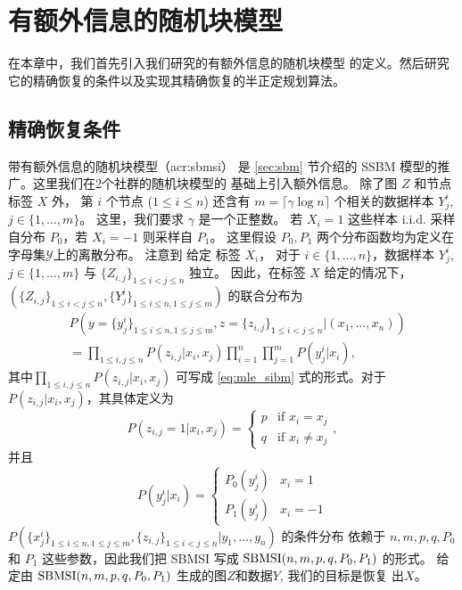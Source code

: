 \chapter{有额外信息的随机块模型}
\label{chap:sbmsi}
在本章中，我们首先引入我们研究的有额外信息的随机块模型
的定义。然后研究它的精确恢复的条件以及实现其精确恢复的半正定规划算法。

\section{精确恢复条件}
\label{sec:sbmsi_exact_recovery_condtion}
带有额外信息的随机块模型（\gls{acr:sbmsi}）
是 \ref{sec:sbm} 节介绍的
SSBM 模型的推广。这里我们在2个社群的随机块模型的
基础上引入额外信息。
除了图 $Z$ 和节点标签 $X$ 外，
第 $i$  个节点 ($1\leq i \leq n$) 
还含有 $m=\lceil \gamma \log n \rceil $ 个相关的数据样本 
$Y^{i}_{j}$, $j\in \{1,\ldots,m\}$。
这里，我们要求 $\gamma$ 是一个正整数。
若 $X_i=1$
这些样本 i.i.d. 采样自分布 $P_0$，若  $X_i=-1$ 则采样自 $P_1$。
这里假设 $P_0, P_1$ 两个分布函数均为定义在字母集$\mathcal{Y}$上的离散分布。
注意到 给定 标签 $X_i$，
对于 $i\in\{1,\ldots,n\}$，数据样本 $Y^{i}_{j}$, $j\in \{1,\ldots,m\}$ 与 $\{Z_{i,j}\}_{1\le i<j\le n}$ 独立。
 因此，在标签 $X$ 给定的情况下，
  $(\{Z_{i,j}\}_{1\le i<j\le n},\{Y^i_{j}\}_{1\le i\le n,1\le j\le m})$ 的联合分布为  
\begin{align}\label{eq:lh}
    &P(y=\{y^i_{j}\}_{1\le i\le n,1\le j\le m},z=\{z_{i,j}\}_{1\le i<j\le n}| (x_1,\ldots,x_n)) \nonumber\\
    &= \prod_{1\le i,j\le n}P(z_{i,j}|x_i,x_j)\prod_{i=1}^n \prod_{j=1}^m P(y^i_j|x_i), 
\end{align}
其中$\prod_{1\le i,j\le n}P(z_{i,j}|x_i,x_j)$ 可写成
\eqref{eq:mle_sibm} 式的形式。对于$P(z_{i,j}|x_i,x_j)$，其具体定义为
\begin{equation*}
    P  (z_{i,j}=1|x_i,x_j) = \begin{cases}
        p & \text{if } x_i = x_j \\
        q & \text{if } x_i\ne x_j
    \end{cases},
\end{equation*}
并且
\begin{equation*}
    P(y^i_j|x_i) = \begin{cases}
        P_0(y^i_j) & x_i = 1 \\
        P_1(y^i_j) & x_i = -1
    \end{cases}
\end{equation*}
 $P(\{x^i_{j}\}_{1\le i\le n,1\le j\le m},\{z_{i,j}\}_{1\le i<j\le n}| y_1,\ldots,y_n)$ 
 的条件分布 依赖于
 $n,m,p, q, P_0$ 和 $P_1$ 这些参数，因此我们把 SBMSI 写成 $\operatorname{SBMSI}(n,m,p,q,P_0,P_1)$ 的形式。
 给定由 $\operatorname{SBMSI}(n,m,p,q,P_0,P_1)$ 生成的图$Z$和数据$Y$, 我们的目标是恢复 出$X$。
 
